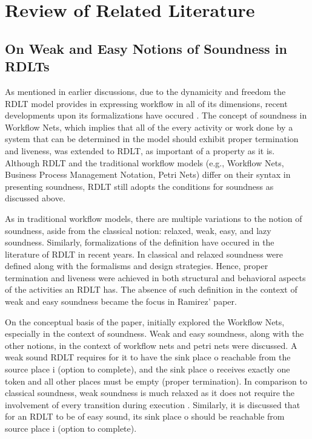 \chapter{Review of Related Literature}\label{chap:RRL}
\section{On Weak and Easy Notions of Soundness in RDLTs}
As mentioned in earlier discussions, due to the dynamicity and freedom the RDLT model provides in expressing workflow in all of its dimensions, recent developments upon its formalizations have occured \cite{Malinao2017}. The concept of soundness in Workflow Nets, which implies that all of the every activity or work done by a system that can be determined in the model should exhibit proper termination and liveness, was extended to RDLT, as important of a property as it is. Although RDLT and the traditional workflow models (e.g., Workflow Nets, Business Process Management Notation, Petri Nets) differ on their syntax in presenting soundness, RDLT still adopts the conditions for soundness as discussed above. 

As in traditional workflow models, there are multiple variations to the notion of soundness, aside from the classical notion: relaxed, weak, easy, and lazy soundness. Similarly, formalizations of the definition have occured in the literature of RDLT in recent years. In \cite{MalinaoPJS2023} classical and relaxed soundness were defined along with the formalisms and design strategies. Hence, proper termination and liveness were achieved in both structural and behavioral aspects of the activities an RDLT has. The absence of such definition in the context of weak and easy soundness became the focus in Ramirez' \cite{Ramirez2024} paper. 

On the conceptual basis of the paper, \cite{Ramirez2024} initially explored the Workflow Nets, especially in the context of soundness. Weak and easy soundness, along with the other notions, in the context of workflow nets and petri nets were discussed. A weak sound RDLT requires for it to have the sink place o reachable from the source place i (option to complete), and the sink place o receives exactly one token and all other places must be empty (proper termination). In comparison to classical soundness, weak soundness is much relaxed as it does not require the involvement of every transition during execution \cite{Ramirez2024}. Similarly, it is discussed that for an RDLT to be of easy sound, its sink place o should be reachable from source place i (option to complete). %

